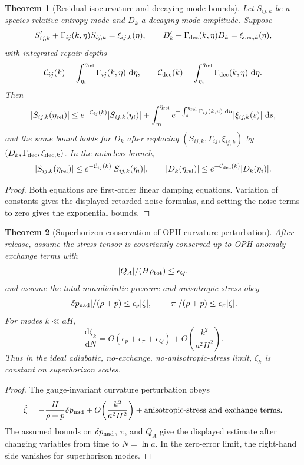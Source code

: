 \documentclass[11pt]{article}
\newtheorem{theorem}{Theorem}[section]
\newcommand{\dd}{\,\mathrm d}
\begin{document}
\begin{theorem}[Residual isocurvature and decaying-mode bounds]\label{thm:isocurvature-decay}
Let \(S_{ij,k}\) be a species-relative entropy mode and \(D_k\) a decaying-mode amplitude. Suppose
\[
S_{ij,k}'+\Gamma_{ij}(k,\eta)S_{ij,k}=\xi_{ij,k}(\eta),
\qquad
D_k'+\Gamma_{\rm dec}(k,\eta)D_k=\xi_{{\rm dec},k}(\eta),
\]
with integrated repair depths
\[
\mathcal C_{ij}(k)=\int_{\eta_i}^{\eta_{\rm rel}}\Gamma_{ij}(k,\eta)\,\dd\eta,
\qquad
\mathcal C_{\rm dec}(k)=\int_{\eta_i}^{\eta_{\rm rel}}\Gamma_{\rm dec}(k,\eta)\,\dd\eta .
\]
Then
\[
|S_{ij,k}(\eta_{\rm rel})|
\le
e^{-\mathcal C_{ij}(k)}|S_{ij,k}(\eta_i)|
+
\int_{\eta_i}^{\eta_{\rm rel}}
e^{-\int_s^{\eta_{\rm rel}}\Gamma_{ij}(k,u)\,\dd u}
|\xi_{ij,k}(s)|\,\dd s,
\]
and the same bound holds for \(D_k\) after replacing
\((S_{ij,k},\Gamma_{ij},\xi_{ij,k})\) by
\((D_k,\Gamma_{\rm dec},\xi_{{\rm dec},k})\). In the noiseless branch,
\[
|S_{ij,k}(\eta_{\rm rel})|\le e^{-\mathcal C_{ij}(k)}|S_{ij,k}(\eta_i)|,
\qquad
|D_k(\eta_{\rm rel})|\le e^{-\mathcal C_{\rm dec}(k)}|D_k(\eta_i)|.
\]
\end{theorem}

\begin{proof}
Both equations are first-order linear damping equations. Variation of constants gives the displayed
retarded-noise formulas, and setting the noise terms to zero gives the exponential bounds.
\end{proof}

\begin{theorem}[Superhorizon conservation of OPH curvature perturbation]\label{thm:zeta-conservation}
After release, assume the stress tensor is covariantly conserved up to OPH anomaly exchange terms
with
\[
|Q_A|/(H\rho_{\rm tot})\le\epsilon_Q,
\]
and assume the total nonadiabatic pressure and anisotropic stress obey
\[
|\delta p_{\rm nad}|/(\rho+p)\le\epsilon_p|\zeta|,
\qquad
|\pi|/(\rho+p)\le\epsilon_\pi|\zeta|.
\]
For modes \(k\ll aH\),
\[
\frac{\dd\zeta_k}{\dd N}
=
O(\epsilon_p+\epsilon_\pi+\epsilon_Q)
+
O\!\left(\frac{k^2}{a^2H^2}\right).
\]
Thus in the ideal adiabatic, no-exchange, no-anisotropic-stress limit, \(\zeta_k\) is constant on
superhorizon scales.
\end{theorem}

\begin{proof}
The gauge-invariant curvature perturbation obeys
\[
\dot\zeta
=
-\frac{H}{\rho+p}\delta p_{\rm nad}
+
O\!\left(\frac{k^2}{a^2H^2}\right)
+
\text{anisotropic-stress and exchange terms}.
\]
The assumed bounds on \(\delta p_{\rm nad}\), \(\pi\), and \(Q_A\) give the displayed estimate after
changing variables from time to \(N=\ln a\). In the zero-error limit, the right-hand side vanishes for
superhorizon modes.
\end{proof}
\end{document}
